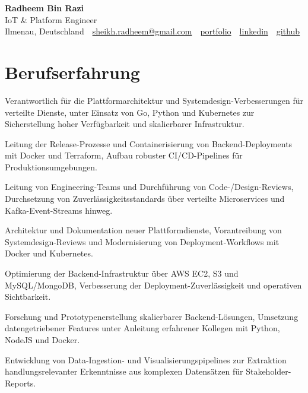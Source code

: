 \documentclass[11pt,a4paper]{resume}
\makeatletter
\newcommand{\Portfolio}{https://radheem.github.io/my-cv}
\newcommand{\PortfolioText}{portfolio}
\newcommand{\GitHub}{https://github.com/radheem}
\newcommand{\LinkedIn}{https://www.linkedin.com/in/radheem-razi}
\newcommand{\Email}{sheikh.radheem@gmail.com}
\makeatother
\begin{document}
\clearpage
{}

\begin{center}
  {\huge\bfseries Radheem Bin Razi}\\[3pt]
  {\large IoT \& Platform Engineer}\\[6pt]
  \small
  Ilmenau, Deutschland \,\textbar\,
  \href{mailto:\Email}{\Email} \,\textbar\,
  \href{\Portfolio}{\PortfolioText} \,\textbar\,
  \href{\LinkedIn}{linkedin} \,\textbar\,
  \href{\GitHub}{github}
\end{center}
\vspace{2pt}

\section{Berufserfahrung}

\bullets
  \item Verantwortlich für die Plattformarchitektur und Systemdesign-Verbesserungen für verteilte Dienste, unter Einsatz von Go, Python und Kubernetes zur Sicherstellung hoher Verfügbarkeit und skalierbarer Infrastruktur.
  \item Leitung der Release-Prozesse und Containerisierung von Backend-Deployments mit Docker und Terraform, Aufbau robuster CI/CD-Pipelines für Produktionsumgebungen.
  \item Leitung von Engineering-Teams und Durchführung von Code-/Design-Reviews, Durchsetzung von Zuverlässigkeitsstandards über verteilte Microservices und Kafka-Event-Streams hinweg.
\bulletsend
\vspace{3pt}
\bullets
  \item Architektur und Dokumentation neuer Plattformdienste, Vorantreibung von Systemdesign-Reviews und Modernisierung von Deployment-Workflows mit Docker und Kubernetes.
  \item Optimierung der Backend-Infrastruktur über AWS EC2, S3 und MySQL/MongoDB, Verbesserung der Deployment-Zuverlässigkeit und operativen Sichtbarkeit.
\bulletsend
\vspace{3pt}
\bullets
  \item Forschung und Prototypenerstellung skalierbarer Backend-Lösungen, Umsetzung datengetriebener Features unter Anleitung erfahrener Kollegen mit Python, NodeJS und Docker.
  \item Entwicklung von Data-Ingestion- und Visualisierungspipelines zur Extraktion handlungsrelevanter Erkenntnisse aus komplexen Datensätzen für Stakeholder-Reports.
\bulletsend
\vspace{3pt}
\end{document}
